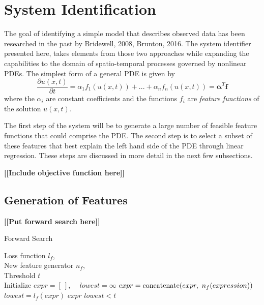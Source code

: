 \documentclass{article}
\newcommand{\todo}[1]{\textbf{[[#1]]}}
\begin{document}
\section{System Identification}
\label{systemidentification}

The goal of identifying a simple model that describes observed data has been researched in the past by Bridewell, 2008, Brunton, 2016. The system identifier presented here, takes elements from those two approaches while expanding the capabilities to the domain of spatio-temporal processes governed by nonlinear PDEs. The simplest form of a general PDE is given by
\[ \frac{\partial u(x,t)}{\partial t} = \alpha_1 f_1(u(x,t)) + ... + \alpha_n f_n(u(x,t)) = \bm{\alpha}^T \bm{f} \]
where the $\alpha_i$ are constant coefficients and the functions $f_i$ are \textit{feature functions} of the solution $u(x,t)$.

The first step of the system will be to generate a large number of feasible feature functions that could comprise the PDE. The second step is to select a subset of these features that best explain the left hand side of the PDE through linear regression. These steps are discussed in more detail in the next few subsections.

\todo{Include objective function here}

\subsection{Generation of Features}

\todo{Put forward search here}
\begin{algorithm}[tb]
   \caption{Forward Search}
   \label{alg:fs}
\begin{algorithmic}
    Loss function $l_f$, \\
   \quad \quad \quad New feature generator $n_f$, \\
   \quad \quad \quad Threshold $t$ \\
   \STATE Initialize $expr = [ \ ]$,   $\quad lowest = \infty$
   \REPEAT
   \STATE $expr = {\rm concatenate}(expr, \ n_f(expression))$
   \STATE $lowest = l_f(expr)$
   \ELSE
    $expr$
   \ENDIF
   \UNTIL $lowest < t$
\end{algorithmic}
\end{algorithm}
\end{document}
